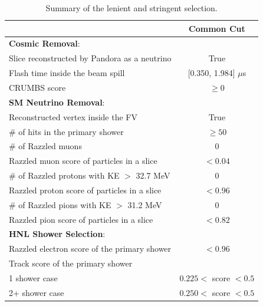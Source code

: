 \begin{table}[htbp!]
\caption[Summary of the Lenient and Stringent Selection]{Summary of the lenient and stringent selection.}
\label{table:cut_summary}
\centering
\begin{center}
\begin{tabular}{| p{7.75cm} | m{3.25cm} | m{3.25cm} |} 
 \hline
  & \multicolumn{2}{c|}{\textbf{Common Cut}} \\ [1ex] 
 \hline
 \textbf{Cosmic Removal}: & \multicolumn{2}{c|}{} \\ [1ex] 
 Slice reconstructed by Pandora as a neutrino & \multicolumn{2}{c|}{True} \\ 
 Flash time inside the beam spill & \multicolumn{2}{c|}{[0.350, 1.984] $\mu$s} \\ 
 CRUMBS score  & \multicolumn{2}{c|}{$\geq 0$} \\ [1ex] 
 \hline
 \textbf{SM Neutrino Removal}: & \multicolumn{2}{c|}{} \\ [1ex] 
 Reconstructed vertex inside the FV & \multicolumn{2}{c|}{True} \\
 \# of hits in the primary shower & \multicolumn{2}{c|}{$\geq 50$} \\ [1ex]
 \# of Razzled muons & \multicolumn{2}{c|}{0} \\
 Razzled muon score of particles in a slice & \multicolumn{2}{c|}{$< 0.04$} \\ [1ex]
 \# of Razzled protons with KE $>$ 32.7 MeV & \multicolumn{2}{c|}{0} \\
 Razzled proton score of particles in a slice & \multicolumn{2}{c|}{$< 0.96$} \\ [1ex]
 \# of Razzled pions with KE $>$ 31.2 MeV & \multicolumn{2}{c|}{0} \\
 Razzled pion score of particles in a slice & \multicolumn{2}{c|}{$< 0.82$} \\ [1ex]
 \hline
 \textbf{HNL Shower Selection}: & \multicolumn{2}{c|}{} \\ [1ex] 
 Razzled electron score of the primary shower & \multicolumn{2}{c|}{$< 0.96$} \\ [1ex]
 Track score of the primary shower & \multicolumn{2}{c|}{} \\
 \hspace{0.5cm}1 shower case & \multicolumn{2}{c|}{$0.225 <$ score $< 0.5$} \\
 \hspace{0.5cm}2+ shower case & \multicolumn{2}{c|}{$0.250 <$ score $< 0.5$} \\
 \cline{2-3}

\end{tabular}
\end{center}
\end{table}
